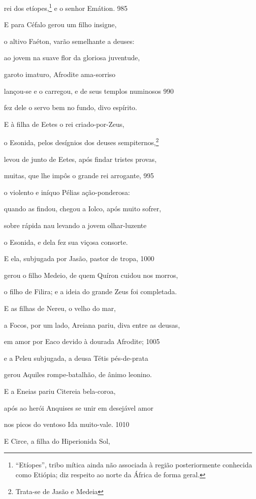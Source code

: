 rei dos etíopes,\footnote{``Etíopes'', tribo mítica ainda não associada à região
posteriormente conhecida como Etiópia; diz respeito ao norte da África
de forma geral.} e o senhor Emátion. \num{985}

E para Céfalo gerou um filho insigne,

o altivo Faéton, varão semelhante a deuses:

ao jovem na suave flor da gloriosa juventude,

garoto imaturo, Afrodite ama-sorriso

lançou-se e o carregou, e de seus templos numinosos \num{990}

fez dele o servo bem no fundo, divo espírito.

\quad{}E à filha de Eetes o rei criado-por-Zeus,

o Esonida, pelos desígnios dos deuses sempiternos,\footnote{Trata-se de Jasão e Medeia}

levou de junto de Eetes, após findar tristes provas,

muitas, que lhe impôs o grande rei arrogante, \num{995}

o violento e iníquo Pélias ação-ponderosa:

quando as findou, chegou a Iolco, após muito sofrer,

sobre rápida nau levando a jovem olhar-luzente

o Esonida, e dela fez sua viçosa consorte.

E ela, subjugada por Jasão, pastor de tropa, \num{1000}

gerou o filho Medeio, de quem Quíron cuidou nos morros,

o filho de Filira; e a ideia do grande Zeus foi completada.

\quad{}E as filhas de Nereu, o velho do mar,

a Focos, por um lado, Areiana pariu, diva entre as deusas,

em amor por Eaco devido à dourada Afrodite; \num{1005}

e a Peleu subjugada, a deusa Tétis pés-de-prata

gerou Aquiles rompe-batalhão, de ânimo leonino.

\quad{}E a Eneias pariu Citereia bela-coroa,

após ao herói Anquises se unir em desejável amor

nos picos do ventoso Ida muito-vale. \num{1010}

\quad{}E Circe, a filha do Hiperionida Sol,

